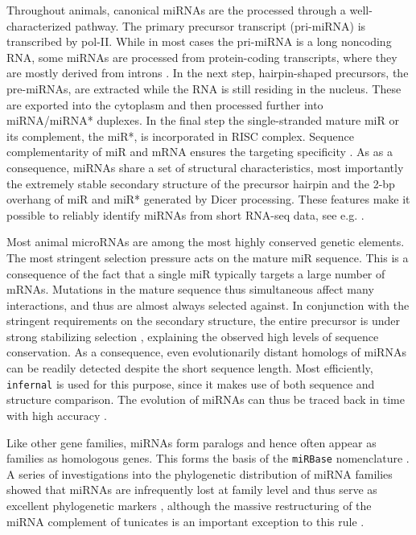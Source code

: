 \documentclass[graybox]{svmult}
\begin{document}
Throughout animals, canonical miRNAs are the processed through a
well-characterized pathway. The primary precursor transcript (pri-miRNA) is
transcribed by pol-II. While in most cases the pri-miRNA is a long
noncoding RNA, some miRNAs are processed from protein-coding transcripts,
where they are mostly derived from introns \cite{Lin:06}. In the next step,
hairpin-shaped precursors, the pre-miRNAs, are extracted while the RNA is
still residing in the nucleus. These are exported into the cytoplasm
\cite{Lund:04} and then processed further into miRNA/miRNA* duplexes. In
the final step the single-stranded mature miR or its complement, the miR*,
is incorporated in RISC complex. Sequence complementarity of miR and mRNA
ensures the targeting specificity \cite{Bartel:13}. As as a consequence,
miRNAs share a set of structural characteristics, most importantly the
extremely stable secondary structure of the precursor hairpin and the 2-bp
overhang of miR and miR* generated by Dicer processing. These features make
it possible to reliably identify miRNAs from short RNA-seq data, see e.g.
\cite{Langenberger:10a, Friedlaender:12, Langenberger:13a}.

Most animal microRNAs are among the most highly conserved genetic elements.
The most stringent selection pressure acts on the mature miR sequence. This
is a consequence of the fact that a single miR typically targets a large
number of mRNAs. Mutations in the mature sequence thus simultaneous affect
many interactions, and thus are almost always selected against. In
conjunction with the stringent requirements on the secondary structure, the
entire precursor is under strong stabilizing selection \cite{Price:11},
explaining the observed high levels of sequence conservation. As a
consequence, even evolutionarily distant homologs of miRNAs can be readily
detected despite the short sequence length. Most efficiently,
\texttt{infernal} \cite{Nawrocki:13} is used for this purpose, since it
makes use of both sequence and structure comparison. The evolution of
miRNAs can thus be traced back in time with high accuracy \cite{Hertel:06a}. 

Like other gene families, miRNAs form paralogs \cite{Tanzer:04a, Hertel:12a}
and hence often appear as families as homologous genes. This forms the
basis of the \texttt{miRBase} nomenclature \cite{Ambrose:03a}. A series of
investigations into the phylogenetic distribution of miRNA families showed
that miRNAs are infrequently lost at family level and thus serve as
excellent phylogenetic markers \cite{Sempere:06, Heimberg:08, Heimberg:10, 
Wheeler:09}, although the massive restructuring of the miRNA complement of 
tunicates is an important exception to this rule \cite{Fu:08}.
\end{document}
